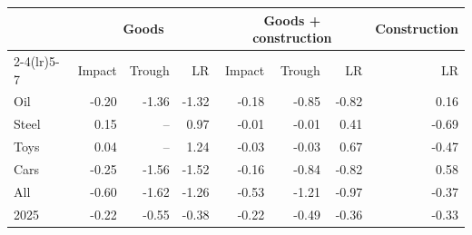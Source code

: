 \begin{tabular}{lrrrrrrr}
\toprule
 & \multicolumn{3}{c}{Goods} & \multicolumn{3}{c}{Goods + construction} & Construction \\
\cmidrule(lr){2-4}\cmidrule(lr){5-7}
 & Impact & Trough & LR & Impact & Trough & LR & LR \\
\midrule
Oil & -0.20 & -1.36 & -1.32 & -0.18 & -0.85 & -0.82 & 0.16 \\
Steel & 0.15 & -- & 0.97 & -0.01 & -0.01 & 0.41 & -0.69 \\
Toys & 0.04 & -- & 1.24 & -0.03 & -0.03 & 0.67 & -0.47 \\
Cars & -0.25 & -1.56 & -1.52 & -0.16 & -0.84 & -0.82 & 0.58 \\
All & -0.60 & -1.62 & -1.26 & -0.53 & -1.21 & -0.97 & -0.37 \\
2025 & -0.22 & -0.55 & -0.38 & -0.22 & -0.49 & -0.36 & -0.33 \\
\bottomrule
\end{tabular}

